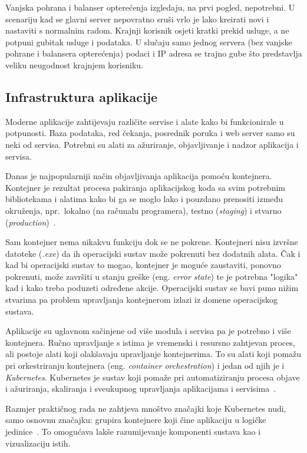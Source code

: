 Vanjska pohrana i balanser opterećenja izgledaju, na prvi pogled, nepotrebni.
U scenariju kad se glavni server nepovratno sruši vrlo je lako kreirati novi i nastaviti s normalnim radom.
Krajnji korisnik osjeti kratki prekid usluge, a ne potpuni gubitak usluge i podataka.
U slučaju samo jednog servera (bez vanjske pohrane i balansera opterećenja) podaci i IP adresa se trajno gube što predstavlja veliku
neugodnost krajnjem korisniku.

\subsection{Infrastruktura aplikacije}

Moderne aplikacije zahtijevaju različite servise i alate kako bi funkcionirale u potpunosti.
Baza podataka, red čekanja, posrednik poruka i web server samo su neki od servisa.
Potrebni su alati za ažuriranje, objavljivanje i nadzor aplikacija i servisa.

Danas je najpopularniji način objavljivanja aplikacija pomoću kontejnera.
Kontejner je rezultat procesa pakiranja aplikacijskog koda sa svim potrebnim bibliotekama i alatima kako bi ga se moglo
lako i pouzdano prenositi između okruženja, npr.\ lokalno (na računalu programera), testno (\textit{staging}) i
stvarno (\textit{production})~\cite{docker-containers}.

Sam kontejner nema nikakvu funkciju dok se ne pokrene.
Kontejneri nisu izvršne datoteke (\textit{.exe}) da ih operacijski sustav može pokrenuti bez dodatnih alata.
Čak i kad bi operacijski sustav to mogao, kontejner je moguće zaustaviti, ponovno pokrenuti, može završiti u stanju
greške (eng. \textit{error state}) te je potrebna "logika" kad i kako treba poduzeti određene akcije.
Operacijski sustav se bavi puno nižim stvarima pa problem upravljanja kontejnerom izlazi iz domene operacijskog sustava.

Aplikacije su uglavnom sačinjene od više modula i servisa pa je potrebno i više kontejnera.
Ručno upravljanje s istima je vremenski i resursno zahtjevan proces, ali postoje alati koji olakšavaju upravljanje kontejnerima.
To su alati koji pomažu pri orkestriranju kontejnera (eng. \textit{container orchestration}) i jedan od njih je i \textit{Kubernetes}.
Kubernetes je sustav koji pomaže pri automatiziranju procesa objave i ažuriranja, skaliranja i sveukupnog
upravljanja aplikacijama i servisima~\cite{kubernetes}.

Razmjer praktičnog rada ne zahtjeva mnoštvo značajki koje Kubernetes nudi, samo osnovnu značajku:
grupira kontejnere koji čine aplikaciju u logičke jedinice~\cite{kubernetes}.
To omogućava lakše razumijevanje komponenti sustava kao i vizualizaciju istih.

